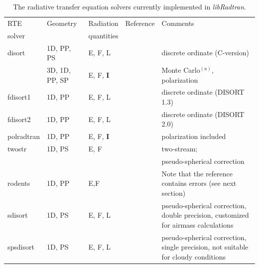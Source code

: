 \begin{table}[htbp]
  \caption[]
  {\label{tab:rte_solvers}The radiative transfer equation solvers
    currently implemented in {\em libRadtran}.}
  \smallskip
  \renewcommand{\arraystretch}{1.2}
  \begin{tabularx}{1.0\hsize}{lp{1.5cm}lp{4cm}X}
    \hline
    RTE        & Geometry & Radiation       & Reference            &
    Comments        \\ 
    solver     &          & quantities      &                      &
    \\ 
    \hline
    disort & 1D, PP, PS & E, F, L         & \citet{buras2011b}  &
    discrete ordinate (C-version)\\ 
    \ifmystic{MYSTIC     & 3D, 1D, PP, SP & E, F, \bf{I}&
      \citet{mayer2009, emde2007, emde2010, buras2011a, emde2011} & Monte Carlo$^{(a)}$, polarization}\\
    fdisort1 & 1D, PP & E, F, L         & \citet{Stamnes1988c}    &
    discrete ordinate (DISORT 1.3) \\ 
    fdisort2 & 1D, PP & E, F, L         & \citet{stamnes2000}  &
    discrete ordinate (DISORT 2.0) \\ 
    polradtran & 1D, PP & E, F, {\bf I}    & \citet{Evans1991}    &
    polarization included \\ 
    twostr     & 1D, PS & E, F            & \citet{Kylling1995}  & two-stream; \\ 
    &        &                 &                      &
    pseudo-spherical correction\\ 
    rodents    & 1D, PP & E,F             & \citet{Zdunkowski2007}     & Note that the reference contains errors (see next section) \\
    sdisort    & 1D, PS & E, F, L         & \citet{Dahlback1991}   &
    pseudo-spherical correction, \newline double
    precision, customized  \newline for airmass calculations\\
    spsdisort  & 1D, PS & E, F, L         & \citet{Dahlback1991}   &
    pseudo-spherical {correction}, \newline single
    precision, not suitable for cloudy conditions\\ 

\end{tabularx}
\end{table}
